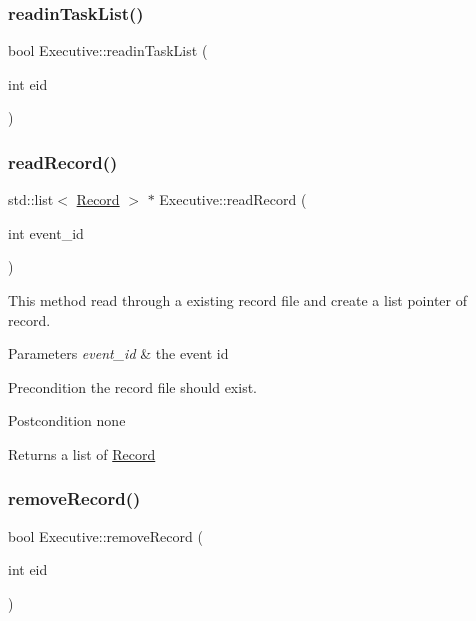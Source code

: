 \subsubsection{\texorpdfstring{readin\+Task\+List()}{readinTaskList()}}
{\footnotesize\ttfamily bool Executive\+::readin\+Task\+List (\begin{DoxyParamCaption}\item[{int}]{eid }\end{DoxyParamCaption})}

\mbox{\label{class_executive_aa0ae7cbbd2aac0b953cdae30d8692f35}} 
\subsubsection{\texorpdfstring{read\+Record()}{readRecord()}}
{\footnotesize\ttfamily std\+::list$<$ \mbox{\hyperlink{class_record}{Record}} $>$ $\ast$ Executive\+::read\+Record (\begin{DoxyParamCaption}\item[{int}]{event\+\_\+id }\end{DoxyParamCaption})}

This method read through a existing record file and create a list pointer of record. 
\begin{DoxyParams}{Parameters}
{\em event\+\_\+id} & the event id \\
\hline
\end{DoxyParams}
\begin{DoxyPrecond}{Precondition}
the record file should exist. 
\end{DoxyPrecond}
\begin{DoxyPostcond}{Postcondition}
none 
\end{DoxyPostcond}
\begin{DoxyReturn}{Returns}
a list of \mbox{\hyperlink{class_record}{Record}} 
\end{DoxyReturn}
\mbox{\label{class_executive_a3f464b27db4195c975283ce20cf3c3f9}} 
\subsubsection{\texorpdfstring{remove\+Record()}{removeRecord()}}
{\footnotesize\ttfamily bool Executive\+::remove\+Record (\begin{DoxyParamCaption}\item[{int}]{eid }\end{DoxyParamCaption})}

